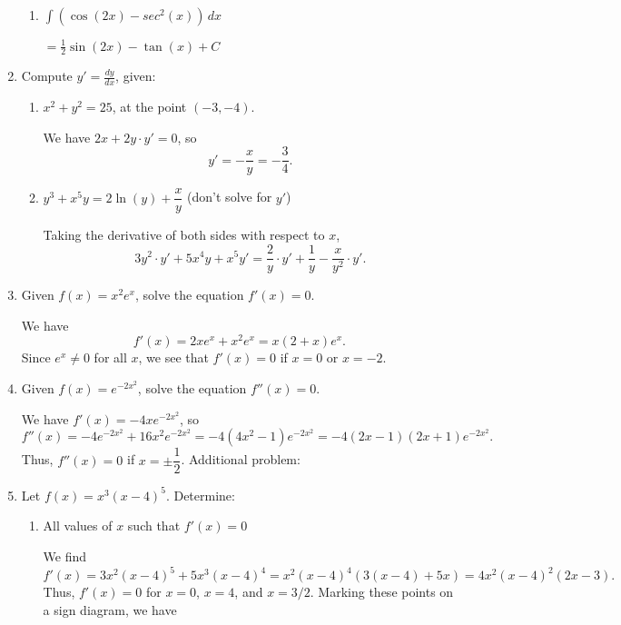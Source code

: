 \documentclass[12pt]{article}
\newcommand{\di}{\displaystyle}
\begin{document}
\begin{enumerate}
\begin{multicols}{2}
\begin{enumerate}
    
    \item $\di\int(\cos(2x)-sec^2(x))\,dx$
    
    $=\frac12 \sin(2x)-\tan(x)+C$
    

    \end{enumerate}
    \end{multicols}
    
    
    \item Compute $y'=\frac{dy}{dx}$, given:
    \begin{multicols}{2}
    \begin{enumerate}
    \item $x^2+y^2=25$, at the point $(-3,-4)$.
    
     We have $2x+2y\cdot y'=0$, so
     \[
     y'=-\frac{x}{y}=-\frac34.
     \]
    
    \item $y^3+x^5y=2\ln(y)+\dfrac{x}{y}$ (don't solve for $y'$)
    
    Taking the derivative of both sides with respect to $x$,
    \[
    3y^2\cdot y'+5x^4y+x^5y'=\frac2y \cdot y'+\frac1y-\frac{x}{y^2}\cdot y'.
    \]
    \end{enumerate}
    \end{multicols}
    
    
    
    \item Given $f(x) = x^2e^x$, solve the equation $f'(x)=0$.
    
    We have
\[
    f'(x)  = 2xe^x+x^2e^x=x(2+x)e^x.
  \]
    Since $e^x\neq 0$ for all $x$, we see that $f'(x)=0$ if $x=0$ or $x=-2$.
    
    \item Given $f(x) = e^{-2x^2}$, solve the equation $f''(x)=0$.

  We have $f'(x) = -4xe^{-2x^2}$, so
  \[
  f''(x) = -4e^{-2x^2}+16x^2e^{-2x^2}=-4(4x^2-1)e^{-2x^2}=-4(2x-1)(2x+1)e^{-2x^2}.
  \]
  Thus, $f''(x)=0$ if $x=\pm\dfrac12$.
  \newpage
  Additional problem:
  
   \item Let $f(x) = x^3(x-4)^5$. Determine:
   \begin{enumerate}
   \item All values of $x$ such that $f'(x)=0$
   
   We find
   \[
   f'(x)=3x^2(x-4)^5+5x^3(x-4)^4=x^2(x-4)^4(3(x-4)+5x) =4x^2(x-4)^2(2x-3).
   \]
   Thus, $f'(x)=0$ for $x=0$, $x=4$, and $x=3/2$. Marking these points on a sign diagram, we have
    \begin{center}
\end{center}
   

\end{enumerate}
\end{enumerate}
\end{document}

